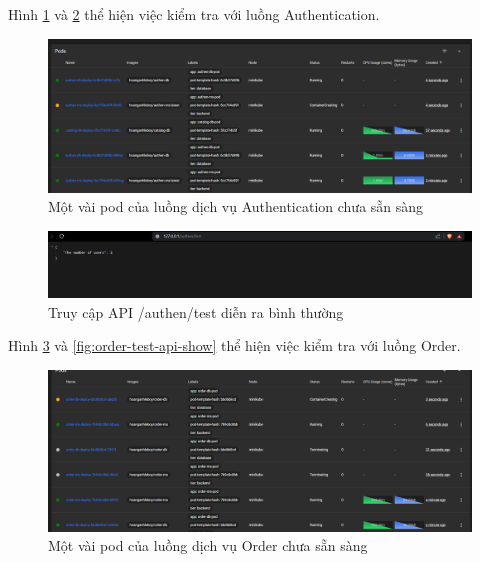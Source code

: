 Hình \ref{fig:authen-test-api-pod-creating} và \ref{fig:authen-test-api-show} thể hiện việc kiểm tra với luồng Authentication.
\begin{figure}[H]
  \begin{center}
      \includegraphics[scale = 0.5]{images/hanh/authen-test-api-pods-creating}
      \vspace*{1mm}
  \end{center}
  \caption{Một vài pod của luồng dịch vụ Authentication chưa sẵn sàng}
  \label{fig:authen-test-api-pod-creating}

\end{figure}

\begin{figure}[H]
  \begin{center}
      \includegraphics[scale = 0.6]{images/hanh/authen-test-api-show}
      \vspace*{1mm}
  \end{center}
  \caption{Truy cập API /authen/test diễn ra bình thường}
  \label{fig:authen-test-api-show}

\end{figure}

Hình \ref{fig:order-test-api-pod-creating} và \ref{fig:order-test-api-show} thể hiện việc kiểm tra với luồng Order.
\begin{figure}[H]
  \begin{center}
      \includegraphics[scale = 0.32]{images/hanh/order-test-api-pods-creating}
      \vspace*{1mm}
  \end{center}
  \caption{Một vài pod của luồng dịch vụ Order chưa sẵn sàng}
  \label{fig:order-test-api-pod-creating}

\end{figure}

